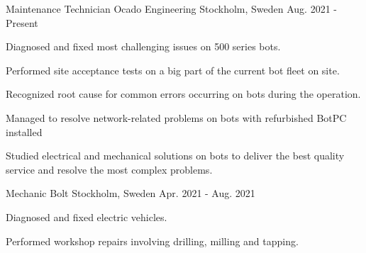 

\begin{cventries}

  \cventry
    {Maintenance Technician} %
    {Ocado Engineering} %
    {Stockholm, Sweden} %
    {Aug. 2021 - Present} %
    {
      \begin{cvitems} %
      \item {Diagnosed and fixed most challenging issues on 500 series bots.}
        \item {Performed site acceptance tests on a big part of the current bot fleet on site.}
        \item {Recognized root cause for common errors occurring on bots during the operation.}
        \item {Managed to resolve network-related problems on bots with refurbished BotPC installed}
        \item {Studied electrical and mechanical solutions on bots to deliver the best quality service and resolve the most complex problems.}
      \end{cvitems}
    }
    
  \cventry
    {Mechanic} %
    {Bolt} %
    {Stockholm, Sweden} %
    {Apr. 2021 - Aug. 2021} %
    {
      \begin{cvitems} %
      \item{Diagnosed and fixed electric vehicles.}
      \item{Performed workshop repairs involving drilling, milling and tapping.}
      \end{cvitems}
    }
    

\end{cventries}
